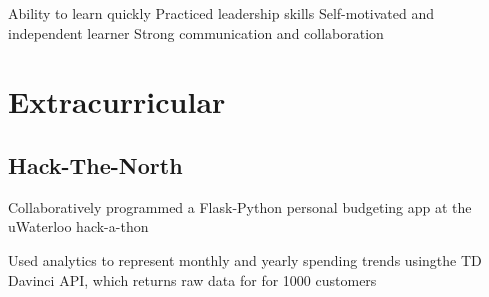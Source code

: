 \documentclass[letterpaper]{deedy-resume} %
\begin{document}
\begin{minipage}[t]{0.33\textwidth}
    \textbullet{} Ability to learn quickly \newline
    \textbullet{} Practiced leadership skills \newline
    \textbullet{} Self-motivated and independent learner \newline
    \textbullet{} Strong communication and collaboration
    \newline
     
    



\sectionspace
\section{Extracurricular}



\subsection{Hack-The-North}
\begin{tightitemize}

\sectionspace{}
\item Collaboratively programmed a Flask-Python personal budgeting app at the uWaterloo hack-a-thon
\item Used analytics to represent monthly and yearly spending trends using\newline  the TD Davinci API, which returns raw data for for 1000 customers
\end{tightitemize}

\end{minipage}
\end{document}
